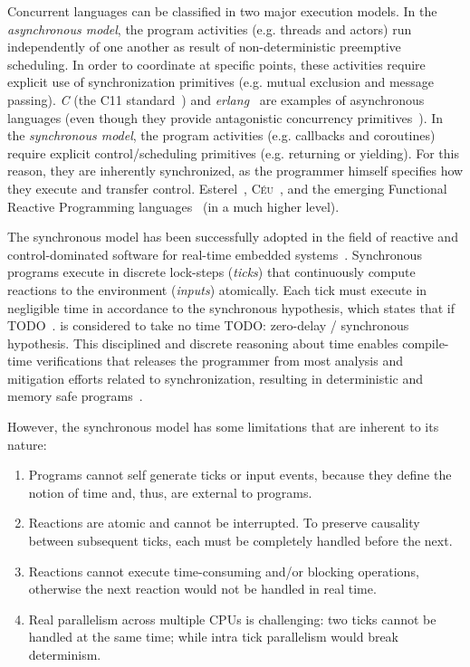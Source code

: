 \documentclass[11pt,a4paper]{article}
\newcommand{\CEU}{\textsc{C\'{e}u}}
\begin{document}
Concurrent languages can be classified in two major execution models.
%
In the \emph{asynchronous model}, the program activities (e.g. threads and 
actors) run independently of one another as result of non-deterministic 
preemptive scheduling.
In order to coordinate at specific points, these activities require explicit 
use of synchronization primitives (e.g. mutual exclusion and message passing).
\emph{C} (the C11 standard~\cite{TODO}) and \emph{erlang}~\cite{TODO} are 
examples of asynchronous languages (even though they provide antagonistic 
concurrency primitives~\cite{TODO}).
%
In the \emph{synchronous model}, the program activities (e.g. callbacks and 
coroutines) require explicit control/scheduling primitives (e.g. returning or 
yielding).
For this reason, they are inherently synchronized, as the programmer himself 
specifies how they execute and transfer control.
%
Esterel~\cite{TODO}, \CEU~\cite{TODO}, and the emerging Functional Reactive 
Programming languages~\cite{TODO} (in a much higher level).

The synchronous model has been successfully adopted in the field of reactive 
and control-dominated software for real-time embedded systems~\cite{rp.twelve}.
%
Synchronous programs execute in discrete lock-steps (\emph{ticks}) that 
continuously compute reactions to the environment (\emph{inputs}) atomically.
%
Each tick must execute in negligible time in accordance to the synchronous 
hypothesis, which states that if TODO~\cite{TODO}.
is considered to take no time
TODO: zero-delay / synchronous hypothesis.
%
This disciplined and discrete reasoning about time enables compile-time 
verifications that releases the programmer from most analysis and mitigation 
efforts related to synchronization, resulting in deterministic and memory safe 
programs~\cite{TODO}.

However, the synchronous model has some limitations that are inherent to its 
nature:
%
\begin{enumerate}
\item Programs cannot self generate ticks or input events, because they define 
        the notion of time and, thus, are external to programs.
\item Reactions are atomic and cannot be interrupted.
        To preserve causality between subsequent ticks, each must be completely
        handled before the next.
\item Reactions cannot execute time-consuming and/or blocking operations, 
        otherwise the next reaction would not be handled in real time.
\item Real parallelism across multiple CPUs is challenging:
        two ticks cannot be handled at the same time;
        while intra tick parallelism would break determinism.
\end{enumerate}
\end{document}
